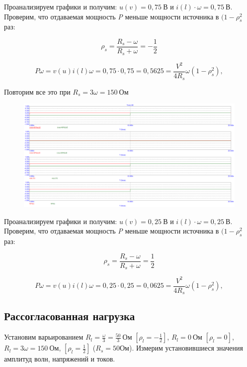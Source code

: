 \documentclass[a4paper, 12pt]{article}%
\begin{document}
Проанализируем графики и получим: $u(v) = 0,75 \: \textit{В}$ и $i(l)\cdot \omega = 0,75 \: \textit{В}$. Проверим, что отдаваемая мощность \textit{P} меньше мощности источника в $(1 - \rho_s^2$ раз:

\[\rho_s = \frac{R_s - \omega}{R_s + \omega} = -\frac{1}{2}\]

\[P\omega = v(u)i(l)\omega = 0,75 \cdot 0,75 = 0,5625 = \frac{V^2}{4R_s} \omega (1 - \rho_s^2),\]

Повторим все это при $R_s = 3\omega = 150 \: \textit{Ом}$

\begin{figure}[h!]
\centering
\includegraphics[scale=0.4]{images/Graph3.png}
\label{fig:Image1}
\end{figure}

Проанализируем графики и получим: $u(v) = 0,25 \: \textit{В}$ и $i(l)\cdot \omega = 0,25 \: \textit{В}$. Проверим, что отдаваемая мощность \textit{P} меньше мощности источника в $(1 - \rho_s^2$ раз:

\[\rho_s = \frac{R_s - \omega}{R_s + \omega} = \frac{1}{2}\]

\[P\omega = v(u)i(l)\omega = 0,25 \cdot 0,25 = 0,0625 = \frac{V^2}{4R_s} \omega (1 - \rho_s^2),\]

\subsection*{Рассогласованная нагрузка}

Установим варьированием $R_l = \frac{\omega}{3} = \frac{50}{3} \: \textit{Ом}$ $[\rho_l = - \frac{1}{2}]$, $R_l = 0 \: \textit{Ом}$ $[\rho_l = 0]$, $R_l = 3\omega = 150 \: \textit{Ом}$, $[\rho_l =  \frac{1}{2}]$ ($R_s = 50 \textit{Ом}$). Измерим установившиеся значения амплитуд волн, напряжений и токов.
\end{document}
